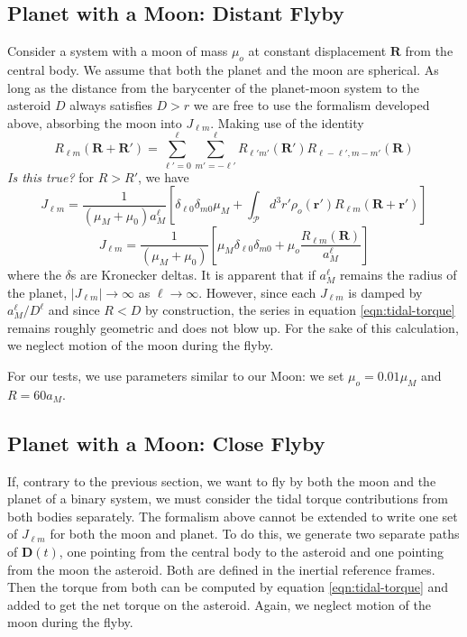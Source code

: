 \documentclass{aastex631}
\newcommand{\brackets}[1]{\left[ #1 \right]}
\newcommand{\jtd}[1]{{\color{red}\textit{#1}}}
\begin{document}
\subsection{Planet with a Moon: Distant Flyby}
Consider a system with a moon of mass $\mu_{o}$ at constant displacement $\bm R$ from the central body. We assume that both the planet and the moon are spherical. As long as the distance from the barycenter of the planet-moon system to the asteroid $D$ always satisfies $D>r$ we are free to use the formalism developed above, absorbing the moon into $J_{\ell m}$. Making use of the identity \cite{Gelderen1998TheSO}
\begin{equation}
R_{\ell m}(\bm R + \bm R') = \sum_{\ell' = 0}^\ell \sum_{m'=-\ell'}^\ell R_{\ell' m'}(\bm R') R_{\ell-\ell', m-m'}(\bm R)
\end{equation}
\jtd{Is this true?}
for $R > R'$, we have
\begin{equation}
J_{\ell m} = \frac{1}{(\mu_M+\mu_0) a_M^\ell}\brackets{\delta_{\ell 0}\delta_{m0}\mu_M + \int_\mathcal{P} d^3 r' \rho_o(\bm r') R_{\ell m}(\bm R + \bm r')}
\end{equation}
\begin{equation}
J_{\ell m} = \frac{1}{(\mu_M+\mu_0)}\brackets{\mu_M\delta_{\ell 0}\delta_{m0} + \mu_o \frac{R_{\ell m}(\bm R)}{ a_M^\ell}}
\end{equation}
where the $\delta$s are Kronecker deltas. It is apparent that if $a_M^\ell$ remains the radius of the planet, $|J_{\ell m}| \rightarrow \infty$ as $\ell \rightarrow \infty$. However, since each $J_{\ell m}$ is damped by $a_M^\ell / D^\ell$ and since $R < D$ by construction, the series in equation \ref{eqn:tidal-torque} remains roughly geometric and does not blow up. For the sake of this calculation, we neglect motion of the moon during the flyby.

For our tests, we use parameters similar to our Moon: we set $\mu_o = 0.01 \mu_M$ and $R = 60 a_M$.


\subsection{Planet with a Moon: Close Flyby}
If, contrary to the previous section, we want to fly by both the moon and the planet of a binary system, we must consider the tidal torque contributions from both bodies separately. The formalism above cannot be extended to write one set of $J_{\ell m}$ for both the moon and planet. To do this, we generate two separate paths of $\bm D(t)$, one pointing from the central body to the asteroid and one pointing from the moon the asteroid. Both are defined in the inertial reference frames. Then the torque from both can be computed by equation \ref{eqn:tidal-torque} and added to get the net torque on the asteroid. Again, we neglect motion of the moon during the flyby.
\end{document}
